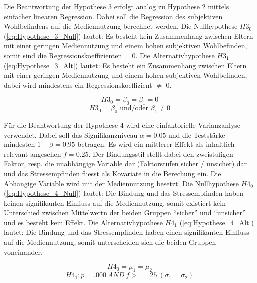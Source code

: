 Die Beantwortung der Hypothese 3 erfolgt analog zu Hypothese 2 mittels einfacher linearen Regression. Dabei soll die Regression des subjektiven Wohlbefindens auf die Mediennutzung berechnet werden. Die Nullhypothese $H3_{0}$ (\ref{eq:Hypothese_3_Null}) lautet: Es besteht kein Zusammenhang zwischen Eltern mit einer geringen Mediennutzung und einem hohen subjektiven Wohlbefinden, somit sind die Regressionskoeffizienten = 0. Die Alternativhypothese $H3_{1}$ (\ref{eq:Hypothese_3_Alt}) lautet: Es besteht ein Zusammenhang zwischen Eltern mit einer geringen Mediennutzung und einem hohen subjektiven Wohlbefinden, dabei wird mindestens ein Regressionskoeffizient $\neq$ 0.

\begin{equation}\label{eq:Hypothese_3_Null}
    H3_{0}=\beta_0 = \beta_1 = 0
\end{equation}
\begin{equation}\label{eq:Hypothese_3_Alt}
    H3_{0}=\beta_0 \text{ und/oder } \beta_1 \neq 0
\end{equation}

Für die Beantwortung der Hypothese 4 wird eine einfaktorielle Varianzanlyse verwendet. Dabei soll das Signifikanzniveau $\alpha=0.05$ und die Teststärke mindesten $1-\beta=0.95$ betragen. Es wird ein mittlerer Effekt \cite{Cohen1988a} als inhaltlich relevant angesehen $f = 0.25$. Der Bindungsstil stellt dabei den zweistufigen Faktor, resp. die unabhängige Variable dar (Faktorstufen sicher / unsicher) dar und das Stressempfinden fliesst als Kovariate in die Berechung ein. Die Abhängige Variable wird mit der Mediennutzung besetzt. Die Nullhypothese $H4_{0}$ (\ref{eq:Hypothese_4_Null}) lautet: Die Bindung und das Stressempfinden haben keinen signifikanten Einfluss auf die Mediennutzung, somit existiert kein Unterschied zwischen Mittelwertn der beiden Gruppen \enquote{sicher} und \enquote{unsicher} und es besteht kein Effekt. Die Alternativhypothese $H4_{1}$ (\ref{eq:Hypothese_4_Alt}) lautet: Die Bindung und das Stressempfinden haben einen signifikanten Einfluss auf die Mediennutzung, somit unterscheiden sich die beiden Gruppen voneinander.

\begin{equation}\label{eq:Hypothese_4_Null}
    H4_{0} = \mu_1 = \mu_2
\end{equation}
\begin{equation}\label{eq:Hypothese_4_Alt}
    H4_{1}:p=.000 ~ AND ~ f>=.25~ (\sigma_1 = \sigma_2)
\end{equation}